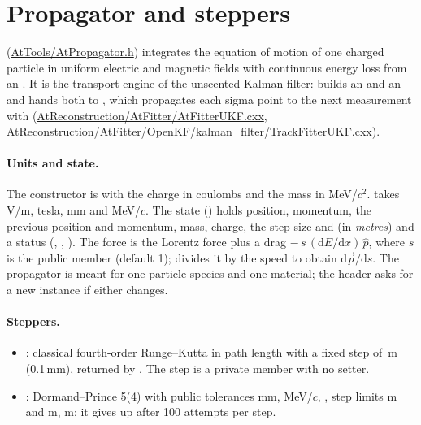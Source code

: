 \section{Propagator and steppers}
\label{sec:tools-prop}

 (\url{AtTools/AtPropagator.h}) integrates the equation of motion of one charged
particle in uniform electric and magnetic fields with continuous energy loss from an . It is the
transport engine of the unscented Kalman filter:  builds an  and an
 and hands both to , which propagates each sigma point to the next
measurement with 
(\url{AtReconstruction/AtFitter/AtFitterUKF.cxx}, \url{AtReconstruction/AtFitter/OpenKF/kalman_filter/TrackFitterUKF.cxx}).

\paragraph{Units and state.}
The constructor is  with the charge
in coulombs and the mass in MeV/$c^2$.  takes V/m,  tesla, 
mm and MeV/$c$. The state () holds position, momentum, the previous position and momentum, mass,
charge, the step size  and  (in \emph{metres}) and a status (,
, ). The force is the Lorentz force plus a drag
$-\,s\,(\mathrm{d}E/\mathrm{d}x)\,\hat p$, where $s$ is the public member  (default 1);
 divides it by the speed to obtain $\mathrm{d}\vec p/\mathrm{d}s$. The propagator is meant for one particle
species and one material; the header asks for a new instance if either changes.

\paragraph{Steppers.}
\begin{itemize}
\item {}: classical fourth-order Runge--Kutta in path length with a fixed step of \,m
  (0.1\,mm), returned by . The step is a private member with no setter.
\item {}: Dormand--Prince 5(4) with public tolerances  mm,
   MeV/$c$, , step limits  m and 
  m,  m; it gives up after 100 attempts per step.
\end{itemize}

